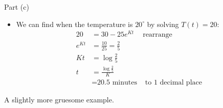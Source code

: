 \begin{eg}
\noindent Part (c)
\begin{itemize}
 \item We can find when the temperature is $20^\circ$ by solving $T(t)=20$:
\begin{align*}
20 &= 30-25 e^{Kt} & \text{rearrange}\\
e^{Kt} &=\frac{10}{25} = \frac{2}{5}  \\
K t &= \log \frac{2}{5}\\
  t &= \frac{\log \frac{2}{5}}{K} \\
  &= \text{20.5 minutes} & \text{ to 1 decimal place}
\end{align*}
\end{itemize}
\end{eg}




A slightly more gruesome example.
